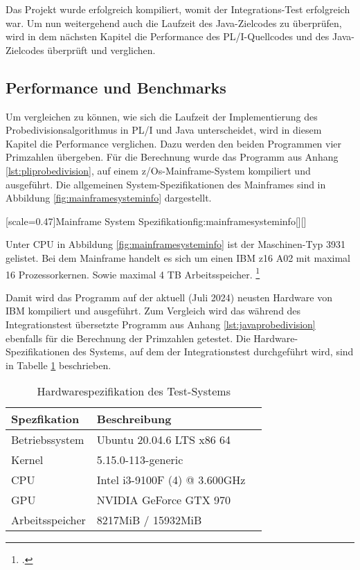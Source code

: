 Das Projekt wurde erfolgreich kompiliert, womit der Integrations-Test erfolgreich war. Um nun weitergehend auch die Laufzeit des Java-Zielcodes zu überprüfen, wird in dem nächsten Kapitel die Performance des PL/I-Quellcodes und des Java-Zielcodes überprüft und verglichen. 
\pagebreak


\subsection{Performance und Benchmarks}
Um vergleichen zu können, wie sich die Laufzeit der Implementierung des Probedivisionsalgorithmus in PL/I und Java unterscheidet, wird in diesem Kapitel die Performance verglichen. 
Dazu werden den beiden Programmen vier Primzahlen übergeben. Für die Berechnung wurde das Programm aus Anhang \ref{lst:pliprobedivision}, auf einem z/Os-Mainframe-System kompiliert und ausgeführt. 
Die allgemeinen System-Spezifikationen des Mainframes sind in Abbildung \ref{fig:mainframesysteminfo} dargestellt.

[scale=0.47]{Mainframe System Spezifikation}{fig:mainframesysteminfo}[][]

Unter CPU in Abbildung \ref{fig:mainframesysteminfo} ist der Maschinen-Typ 3931 gelistet. Bei dem Mainframe handelt es sich um einen IBM z16 A02 mit
maximal 16 Prozessorkernen. Sowie maximal 4 TB Arbeitsspeicher. \footcite{z16}

Damit wird das Programm auf der aktuell (Juli 2024) neusten Hardware von IBM kompiliert und ausgeführt. Zum Vergleich wird das während des Integrationstest übersetzte Programm aus Anhang \ref{lst:javaprobedivision} ebenfalls für die Berechnung der Primzahlen getestet. 
Die Hardware-Spezifikationen des Systems, auf dem der Integrationstest durchgeführt wird, sind in Tabelle \ref{tab:hardwartable} beschrieben.

\begin{table}[h]
	\centering
	\begin{tabularx}{\textwidth}{|X|X|X|}
		\hline
		\textbf{Spezfikation} & \textbf{Beschreibung}  \\
		\hline
		Betriebssystem & Ubuntu 20.04.6 LTS x86 64 \\
		
		Kernel & 5.15.0-113-generic  \\
		
		CPU & Intel i3-9100F (4) @ 3.600GHz \\
		
		GPU & NVIDIA GeForce GTX 970  \\
		
		Arbeitsspeicher & 8217MiB / 15932MiB \\
		\hline
		
	\end{tabularx}
	\caption{Hardwarespezifikation des Test-Systems \label{tab:hardwartable}}
\end{table}


